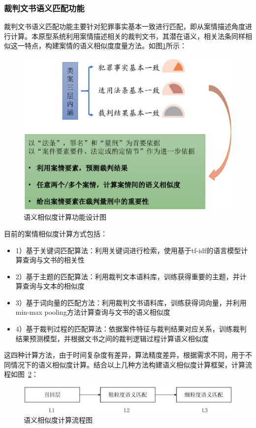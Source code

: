 \subsubsection{裁判文书语义匹配功能}
\label{sec:sys_content}
裁判文书语义匹配功能主要针对犯罪事实基本一致进行匹配，即从案情描述角度进行计算。本原型系统利用案情描述相关的裁判文书，其潜在语义，相关法条同样相似这一特点，构建案情的语义相似度度量方法。如图\ref{fig:sys_similarity}所示：
\begin{figure}[htbp]%
    \centering
    \includegraphics[scale=0.5, clip=true]{./sources/sys_similarity.eps}
    \caption{\label{fig:sys_similarity}语义相似度计算功能设计图}
\end{figure}

目前的案情相似度计算方式包括：
\begin{itemize}
    \item 1）基于关键词匹配算法：利用关键词进行检索，使用基于tf-idf的语言模型计算查询与文书的相关性
    \item 2）基于主题的匹配算法：利用裁判文本语料库，训练获得重要的主题，并计算查询与文本的相似度
    \item 3）基于词向量的匹配方法：利用裁判文书语料库，训练获得词向量，并利用min-max pooling方法计算查询与文书的语义相似度
    \item 4）基于裁判过程的匹配算法：依据案件特征与裁判结果对应关系，训练裁判结果预测模型，并根据文书之间的裁判逻辑过程计算语义相似度
\end{itemize}

这四种计算方法，由于时间复杂度有差异，算法精度差异，根据需求不同，用于不同情况下的语义相似度计算。结合以上几种方法构建语义相似度计算框架，计算流程如图~\ref{fig:sys_similarity2}：
\begin{figure}[htbp]%
    \centering
    \includegraphics[scale=0.5, clip=true]{./sources/sys_similarity2.eps}
    \caption{\label{fig:sys_similarity2}语义相似度计算流程图}
\end{figure}

